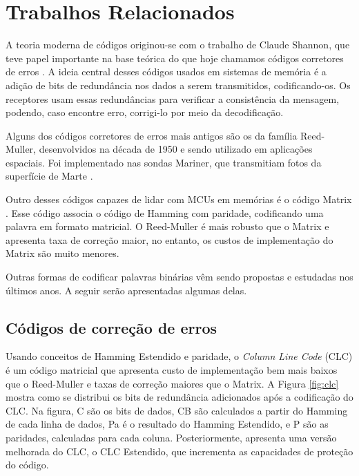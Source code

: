 \section{Trabalhos Relacionados}

A teoria moderna de códigos originou-se com o trabalho de Claude Shannon, que teve papel importante na base teórica do que hoje chamamos códigos corretores de erros \cite{meneghesso2012codigos}. A ideia central desses códigos usados em sistemas de memória é a adição de bits de redundância nos dados a serem transmitidos, codificando-os. Os receptores usam essas redundâncias para verificar a consistência da mensagem, podendo,
caso encontre erro, corrigi-lo por meio da decodificação.

Alguns dos códigos corretores de erros mais antigos são os da família Reed-Muller, desenvolvidos na década de 1950 e sendo utilizado em aplicações espaciais. Foi implementado nas sondas Mariner, que transmitiam fotos da superfície de Marte \cite{varghese2013multiple}.

Outro desses códigos capazes de lidar com MCUs em memórias é o código Matrix \cite{argyrides2007matrix}. Esse código associa o código de Hamming com paridade, codificando uma palavra em formato matricial. O Reed-Muller é mais robusto que o Matrix e apresenta taxa de correção maior, no entanto, os custos de implementação do Matrix são muito menores.

Outras formas de codificar palavras binárias vêm sendo propostas e estudadas nos últimos anos. A seguir serão apresentadas algumas delas.

\subsection{Códigos de correção de erros}

Usando conceitos de Hamming Estendido e paridade, o \textit{Column Line Code} (CLC) \cite{castro2016correction} é um código matricial que apresenta custo de implementação bem mais baixos que o Reed-Muller e taxas de correção maiores que o Matrix. A Figura \ref{fig:clc} mostra como se distribui os bits de redundância adicionados após a codificação do CLC. Na figura, C são os bits de dados, CB são calculados a partir do Hamming de cada linha de dados, Pa é o resultado do Hamming Estendido, e P são as paridades, calculadas para cada coluna. Posteriormente, \cite{silva2018extensible} apresenta uma versão melhorada do CLC, o CLC Estendido, que incrementa as capacidades de proteção do código.


